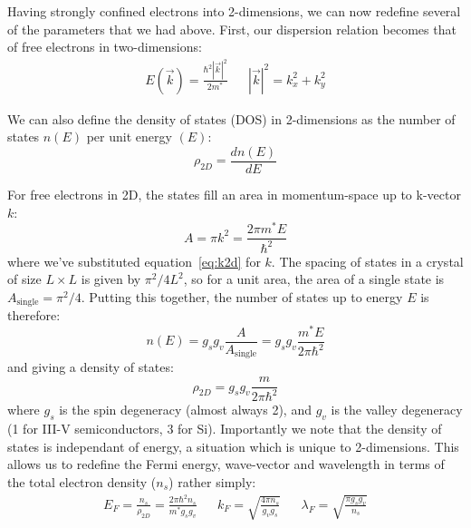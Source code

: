 Having strongly confined electrons into 2-dimensions, we can now redefine several of the parameters that we had above. First, our
dispersion relation becomes that of free electrons in two-dimensions:
\begin{align}
  E(\vec{k}) = \frac{\hbar^2 |\vec{k}|^2}{2m^*} && |\vec{k}|^2 = k_x^2 + k_y^2
  \label{eq:k2d}
\end{align}

We can also define the density of states (DOS) in 2-dimensions as the number of states $n(E)$ per unit energy $(E)$:
\begin{equation}
  \rho_{2D} = \frac{d n(E)}{d E}
\end{equation}

For free electrons in 2D, the states fill an area in momentum-space up to k-vector $k$:
\begin{equation}
  A = \pi k^2 = \frac{2 \pi m^* E}{\hbar^2}
\end{equation}
where we've substituted equation~\ref{eq:k2d} for $k$. The spacing of states in a crystal of size $L \times L$ is given
by $\pi^2/4 L^2$, so for a unit area, the area of a single state is $A_{\textrm{single}} = \pi^2/4$. Putting this together, 
the number of states up to energy $E$ is therefore:
\begin{equation}
  n(E) = g_s g_v \frac{A}{A_{\textrm{single}}} = g_s g_v \frac{m^* E}{2 \pi \hbar^2}
\end{equation}
and giving a density of states:
\begin{equation}
  \rho_{2D} = g_s g_v \frac{m}{2 \pi \hbar^2}
\end{equation}
where $g_s$ is the spin degeneracy (almost always 2), and $g_v$ is the valley degeneracy (1 for III-V semiconductors, 3 for Si).
Importantly we note that the density of states is independant of energy, a situation which is unique to 2-dimensions. This allows
us to redefine the Fermi energy, wave-vector and wavelength in terms of the total electron density ($n_s$) rather simply:
\begin{align}
  E_F = \frac{n_s}{\rho_{2D}} = \frac{2 \pi \hbar^2 n_s}{m^* g_s g_v} && 
  k_F = \sqrt{\frac{4 \pi n_s}{g_v g_s}} && 
  \lambda_F = \sqrt{\frac{\pi g_s g_v}{n_s}}
\end{align}

